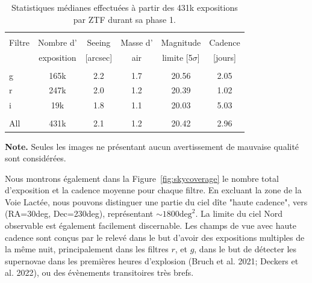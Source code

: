 \documentclass[../main/main.tex]{subfiles}
\begin{document}
\begin{table}[ht]
  \scriptsize
  \centerfloat
  \setlength\tabcolsep{14pt}
  \renewcommand{\arraystretch}{1.2}
  \begin{threeparttable}

    \caption{Statistiques médianes effectuées à partir des 431k
      expositions par ZTF durant sa phase 1.}
    \label{tab:summary_systematics}
    \begin{tabular}{l c c c c c}
      \hline\\[-0.5em]
      \hline\\[-0.5em]
      Filtre  & Nombre d' & Seeing & Masse d' & Magnitude & Cadence\\[0.15em]
              & exposition & [arcsec] &  air & limite [5$\sigma$] & [jours] \\[0.15em]
      \hline\\[-0.5em]
      g   & 165k & 2.2 & 1.7 & 20.56 & 2.05\\[0.30em]
      r   & 247k & 2.0 & 1.2 & 20.39 & 1.02\\[0.30em]
      i   & 19k & 1.8 & 1.1 & 20.03 & 5.03\\[0.30em]
      \hline\\[-0.5em]
      All & 431k & 2.1 & 1.2 & 20.42 & 2.96\\[0.30em]
    \end{tabular}
    \begin{tablenotes}[flushleft]
    \item \textbf{Note.} Seules les images ne présentant aucun
      avertissement de mauvaise
      qualité sont considérées. 
    \end{tablenotes}
  \end{threeparttable}
\end{table}


Nous montrons également dans la Figure~\ref{fig:skycoverage} le nombre
total d'exposition et la cadence moyenne pour chaque filtre. En excluant
la zone de la Voie Lactée, nous pouvons distinguer une partie du ciel
dîte "haute cadence", vers (RA=30deg, Dec=230deg), représentant $\sim1800\text{deg}^{2}$. La limite du ciel
Nord observable est également facilement discernable.
Les champs de vue avec \og haute cadence\fg{} sont conçus par le relevé dans le
but d'avoir des expositions multiples de la même nuit, principalement
dans les filtres $r$, et $g$, dans le but de détecter les supernovae
dans les premières
heures d'explosion (Bruch et al.
2021; Deckers et al. 2022), ou des évènements transitoires très brefs.
\end{document}
